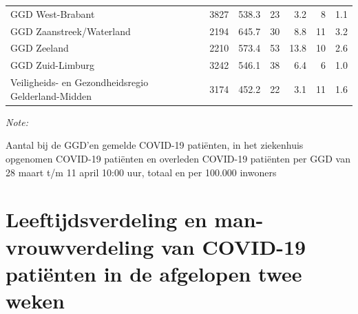 \documentclass[
  english,
  man,floatsintext]{apa6}
\begin{document}
\begin{table}
\begin{threeparttable}
\begin{tabular}{lrrrrrr}
GGD West-Brabant & 3827 & 538.3 & 23 & 3.2 & 8 & 1.1\\
GGD Zaanstreek/Waterland & 2194 & 645.7 & 30 & 8.8 & 11 & 3.2\\
GGD Zeeland & 2210 & 573.4 & 53 & 13.8 & 10 & 2.6\\
GGD Zuid-Limburg & 3242 & 546.1 & 38 & 6.4 & 6 & 1.0\\
Veiligheids- en Gezondheidsregio Gelderland-Midden & 3174 & 452.2 & 22 & 3.1 & 11 & 1.6\\
\bottomrule
\end{tabular}
\begin{tablenotes}
\item \textit{Note: } 
\item Aantal bij de GGD’en gemelde COVID-19 patiënten, in het ziekenhuis opgenomen COVID-19 patiënten en overleden COVID-19 patiënten per GGD van 28 maart t/m 11 april 10:00 uur, totaal en per 100.000 inwoners
\end{tablenotes}
\end{threeparttable}
\endgroup{}
\end{table}

\newpage

\hypertarget{leeftijdsverdeling-en-man-vrouwverdeling-van-covid-19-patiuxebnten-in-de-afgelopen-twee-weken}{%
\section{Leeftijdsverdeling en man-vrouwverdeling van COVID-19 patiënten in de afgelopen twee weken}\label{leeftijdsverdeling-en-man-vrouwverdeling-van-covid-19-patiuxebnten-in-de-afgelopen-twee-weken}}
\end{document}
